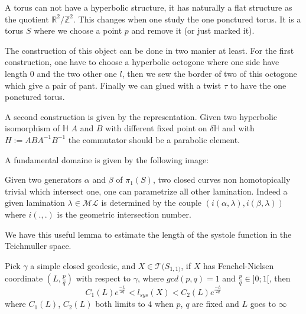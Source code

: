 A torus can not have a hyperbolic structure, it has naturally a flat structure as the quotient $\mathbb{R}^2 / \mathbb{Z}^2$.
This changes when one study the one ponctured torus. It is a torus $S$ where we choose a point $p$ and remove it (or just marked it).

The construction of this object can be done in two manier at least.
For the first construction, one have to choose a hyperbolic octogone where one side have length $0$ and the two other one $l$, then we sew the border of two of this octogone which give a pair of pant. Finally we can glued with a twist $\tau$ to have the one ponctured torus.

A second construction is given by the representation. Given two hyperbolic isomorphism of $\mathbb{H}$ $A$ and $B$ with different fixed point on $\delta \mathbb{H}$ and with $H := ABA^{-1}B^{-1}$ the commutator should be a parabolic element.

A fundamental domaine is given by the following image:




Given two generators $\alpha$ and $\beta$ of $\pi_1(S)$, two closed curves non homotopically trivial which intersect one, one can parametrize all other lamination.
Indeed a given lamination $\lambda \in \mathcal{ML}$ is determined by the couple $(i(\alpha,\lambda),i(\beta,\lambda))$ where $i(.,.)$ is the geometric intersection number.

We have this useful lemma to estimate the length of the systole function in the Teichmuller space.

\begin{lem}
Pick $\gamma$ a simple closed geodesic, and $X \in \mathcal{T}(S_{1,1)}$, if $X$ has Fenchel-Nielsen coordinate $(L,\frac{p}{q})$ with respect to $\gamma$, where $gcd(p,q)=1$ and $\frac{p}{q} \in ]0;1[$, then \[
C_1(L) e^{\frac{-L}{2q}} < l_{sys}(X) < C_2(L) e^{\frac{-L}{2q}}
\]
where $C_1(L)$, $C_2(L)$ both limits to $4$ when $p$, $q$ are fixed and $L$ goes to $\infty$
\end{lem}

